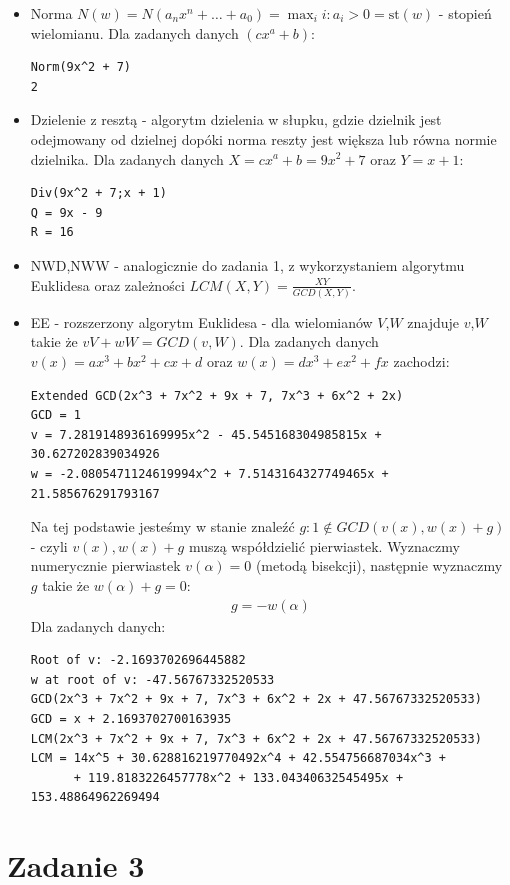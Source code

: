 \documentclass[12pt, a4paper]{article}
\begin{document}
\begin{itemize}
    \item Norma $N(w)=N(a_n x^n + \dots + a_0) = \max_i {i : a_i > 0} = \text{st}(w)$ - stopień wielomianu. Dla zadanych danych $(cx^a+b)$:
    \begin{verbatim}
Norm(9x^2 + 7)
2
    \end{verbatim}
    \item Dzielenie z resztą - algorytm dzielenia w słupku, gdzie dzielnik jest odejmowany od dzielnej dopóki norma reszty jest większa lub równa normie dzielnika.
    Dla zadanych danych $X = cx^a + b = 9x^2 + 7$ oraz $Y = x + 1$:
    \begin{verbatim}
Div(9x^2 + 7;x + 1)
Q = 9x - 9
R = 16
    \end{verbatim}
    \item NWD,NWW - analogicznie do zadania 1, z wykorzystaniem algorytmu Euklidesa oraz zależności $LCM(X,Y) = \frac{XY}{GCD(X,Y)}$.
    \item EE - rozszerzony algorytm Euklidesa - dla wielomianów $V$,$W$ znajduje $v$,$W$ takie że $vV + wW = GCD(v,W)$. 
    Dla zadanych danych $v(x)=ax^3+bx^2+cx+d$ oraz $w(x)=dx^3+ex^2+fx$ zachodzi:
    \begin{verbatim}
Extended GCD(2x^3 + 7x^2 + 9x + 7, 7x^3 + 6x^2 + 2x)
GCD = 1
v = 7.2819148936169995x^2 - 45.545168304985815x + 30.627202839034926
w = -2.0805471124619994x^2 + 7.5143164327749465x + 21.585676291793167
    \end{verbatim}
    Na tej podstawie jesteśmy w stanie znaleźć $g : 1 \notin GCD(v(x),w(x)+g)$ - czyli $v(x), w(x)+g$ muszą współdzielić pierwiastek.
    Wyznaczmy numerycznie pierwiastek $v(\alpha)=0$ (metodą bisekcji), następnie wyznaczmy $g$ takie że $w(\alpha)+g=0$:
    \begin{align*}
        g = -w(\alpha)
    \end{align*}
    Dla zadanych danych:
    \begin{verbatim}
Root of v: -2.1693702696445882
w at root of v: -47.56767332520533
GCD(2x^3 + 7x^2 + 9x + 7, 7x^3 + 6x^2 + 2x + 47.56767332520533)
GCD = x + 2.1693702700163935
LCM(2x^3 + 7x^2 + 9x + 7, 7x^3 + 6x^2 + 2x + 47.56767332520533)
LCM = 14x^5 + 30.628816219770492x^4 + 42.554756687034x^3 + 
      + 119.8183226457778x^2 + 133.04340632545495x + 153.48864962269494
    \end{verbatim}
\end{itemize}

\section{Zadanie 3}
\end{document}
